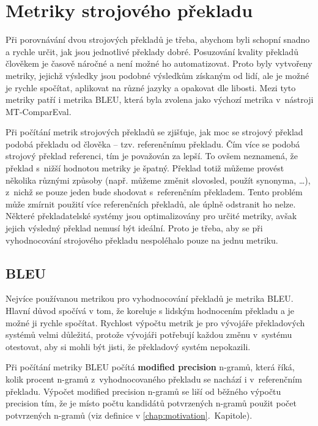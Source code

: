 \chapter{Metriky strojového překladu}
\label{chap:metrics}

Při porovnávání dvou strojových překladů je třeba,
  abychom byli schopní snadno a rychle určit,
  jak jsou jednotlivé překlady dobré.
Posuzování kvality překladů člověkem je časově náročné
  a není možné ho automatizovat.
Proto byly vytvořeny metriky,
  jejichž výsledky jsou podobné výsledkům získaným od lidí,
  ale je možné je rychle spočítat,
  aplikovat na různé jazyky a opakovat dle libosti.
Mezi tyto metriky patří i metrika BLEU,
  která byla zvolena jako výchozí metrika v~nástroji \mbox{MT-ComparEval}.

Při počítání metrik strojových překladů se zjišťuje,
  jak moc se strojový překlad podobá překladu od člověka -- tzv. referenčnímu překladu.
Čím více se podobá strojový překlad referenci,
  tím je považován za lepší.
To ovšem neznamená, že překlad s~nižší hodnotou metriky je špatný.
Překlad totiž můžeme provést několika různými způsoby 
  (např. můžeme změnit slovosled, použít synonyma, \dots),
  z~nichž se pouze jeden bude shodovat s~referenčním překladem.
Tento problém může zmírnit použití více referenčních překladů,
  ale úplně odstranit ho nelze.
Některé překladatelské systémy jsou optimalizovány pro určité metriky,
  avšak jejich výsledný překlad nemusí být ideální.
Proto je třeba,
  aby se při vyhodnocování strojového překladu nespoléhalo pouze na jednu metriku.


\section{BLEU}
Nejvíce používanou metrikou pro vyhodnocování překladů je metrika BLEU.
Hlavní důvod spočívá v tom,
  že koreluje s lidským hodnocením překladu
  a je možné ji rychle spočítat.
Rychlost výpočtu metrik je pro vývojáře překladových systémů velmi důležitá,
  protože vývojáři potřebují každou změnu v~systému otestovat,
  aby si mohli být jisti,
  že překladový systém nepokazili.

Při počítání metriky BLEU počítá \textbf{modified precision} \mbox{n-gramů},
  která říká,
  kolik procent \mbox{n-gramů} z~vyhodnocovaného překladu se nachází i v~referenčním překladu.	
Výpočet modified precision \mbox{n-gramů} se liší od běžného výpočtu precision tím,
  že je místo počtu kandidátů potvrzených \mbox{n-gramů} použit počet potvrzených \mbox{n-gramů} (viz definice v \ref{chap:motivation}.~Kapitole).

